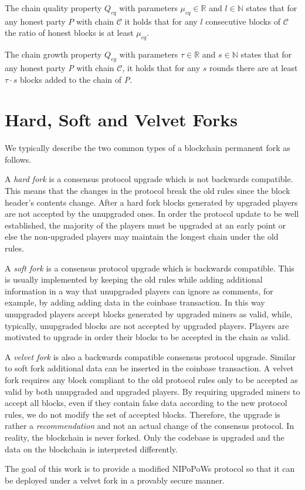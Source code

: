 \begin{definition}
	The chain quality property $Q_{cq}$ with parameters $\mu_{cq} \in \mathbb{R}$ and $l \in \mathbb{N}$ states that for any honest party $P$ with chain $\mathcal{C}$ it holds that for any $l $ consecutive blocks of $\mathcal{C}$ the ratio of honest blocks is at least $\mu_{cq}$.
	\label{defn:chain_quality}
\end{definition}

\begin{definition}
	The chain growth property $Q_{cg}$ with
parameters $\tau \in \mathbb{R}$ and $s \in \mathbb{N}$ states that for any honest party
\textit{P} with chain $\mathcal{C}$, it holds that for any $s$ rounds there are at least 
$\tau \cdot s$ blocks added to the chain of \textit{P}.
	\label{defn:chain_growth}
\end{definition}

\section{Hard, Soft and Velvet Forks}
We typically describe the two common types of a blockchain permanent fork as follows.

A \textit{hard fork} is a consensus protocol upgrade which is not backwards
compatible. This means that the changes in the protocol break the old rules
since the block header's contents change. After a hard fork blocks generated
by upgraded players are not accepted by the unupgraded ones. In order the
protocol update to be well established, the majority of the players must be
upgraded at an early point or else the non-upgraded players may maintain the
longest chain under the old rules.

A \textit{soft fork} is a consensus protocol upgrade which is backwards compatible.
This is usually implemented by keeping the old rules while adding additional
information in a way that unupgraded players can ignore as comments, for example,
by adding adding data in the coinbase transaction. In this way unupgraded players
accept blocks generated by upgraded miners as valid, while, typically, unupgraded
blocks are not accepted by upgraded players. Players are motivated to upgrade in
order their blocks to be accepted in the chain as valid.

A \textit{velvet fork} is also a backwards compatible consensus protocol upgrade.
Similar to soft fork additional data can be inserted in the coinbase transaction.
A velvet fork requires any block compliant to the old protocol rules only to be
accepted as valid by both unupgraded and upgraded players. By requiring upgraded
miners to accept all blocks, even if they contain false data according to the new
protocol rules, we do not modify the set of accepted blocks. Therefore, the upgrade
is rather a \textit{recommendation} and not an actual change of the consensus
protocol.  In reality, the blockchain is never forked. Only the codebase is
upgraded and the data on the blockchain is interpreted differently\cite{nipopows}.

The goal of this work is to provide a modified NIPoPoWs protocol so that it can be
deployed under a velvet fork in a provably secure manner.